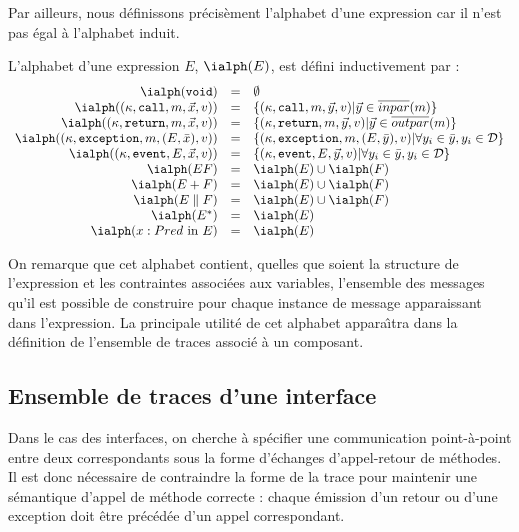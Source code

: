 Par ailleurs, nous d\'efinissons pr\'ecis\`ement l'alphabet d'une
expression car il n'est pas \'egal \`a l'alphabet induit. 

 
\begin{definition}
    \label{def-alph-expr}
    L'alphabet d'une expression $E$,  $\ialph(E)$, est d\'efini inductivement par :
    $$
    \begin{array}{rcl}
        \ialph(\mathtt{void}) &=&\emptyset\\
        \ialph((\kappa,\mathtt{call},m,\vec{x},v))
        &=&\{(\kappa,\mathtt{call},m,\vec{y},v) | \vec{y}\in \overline{inpar}(m)\}\\
        \ialph((\kappa,\mathtt{return},m,\vec{x},v))
        &=&\{(\kappa,\mathtt{return},m,\vec{y},v) | \vec{y}\in \overline{outpar}(m)\}\\
        \ialph((\kappa,\mathtt{exception},m,(E,\bar{x}),v))
        &=&\{(\kappa,\mathtt{exception},m,(E,\bar{y}),v) | \forall y_i \in
        \bar{y}, y_i\in  {\cal D}\}\\
        \ialph((\kappa,\mathtt{event},E,\vec{x},v))
        &=&\{(\kappa,\mathtt{event},E,\vec{y},v) |  \forall y_i \in
        \bar{y}, y_i\in {\cal D}\}\\
        \ialph(E F) &=& \ialph(E)\cup\ialph(F)\\
        \ialph(E + F) &=& \ialph(E)\cup \ialph(F)\\
        \ialph(E \parallel F) &=& \ialph(E)\cup \ialph(F)\\
        \ialph(E^*) &=&\ialph(E)\\
        \ialph(x:Pred \mathrm{~in~} E)
        &=& \ialph(E)\\
    \end{array}
    $$
\end{definition}

On remarque que cet alphabet contient, quelles que soient la structure de
l'expression et les contraintes associ\'ees aux variables,
l'ensemble des messages qu'il est possible de construire pour chaque instance de message
apparaissant dans l'expression. La principale utilit\'e de cet
alphabet appara\^{\i}tra dans la d\'efinition de l'ensemble de traces
associ\'e \`a un composant.

\subsection{Ensemble de traces d'une interface}

Dans le cas des interfaces, on cherche \`a sp\'ecifier une communication
point-\`a-point entre deux correspondants sous la forme d'\'echanges
d'appel-retour de m\'ethodes. Il est donc n\'ecessaire de contraindre la
forme de la trace pour maintenir une s\'emantique d'appel de m\'ethode
correcte : chaque \'emission d'un retour ou d'une exception doit \^etre
pr\'ec\'ed\'ee d'un appel correspondant. 

